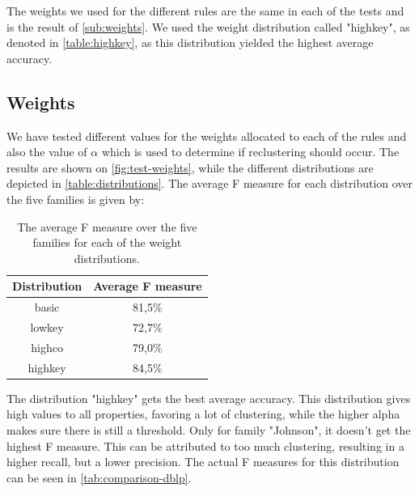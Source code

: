 The weights we used for the different rules are the same in each of the tests and is the result of \autoref{sub:weights}. We used the weight distribution called "highkey", as denoted in \autoref{table:highkey}, as this distribution yielded the highest average accuracy.



\subsection{Weights}
\label{sub:weights}

We have tested different values for the weights allocated to each of the rules and also the value of $\alpha$ which is used to determine if reclustering should occur. The results are shown on \autoref{fig:test-weights}, while the different distributions are depicted in \autoref{table:distributions}. The average F measure for each distribution over the five families is given by:

\begin{table}[ht]
	\center
	\begin{tabular}{|c|c|}
		\hline
		\bfseries{Distribution} & \bfseries{Average F measure} \\
		\hline
		basic & 81,5\% \\
		\hline
		lowkey & 72,7\% \\
		\hline
		highco & 79,0\% \\
		\hline
		highkey & 84,5\% \\
		\hline
	\end{tabular}
	\caption{The average F measure over the five families for each of the weight distributions.}
	\label{tab:avg-f-distr}
\end{table}

The distribution "highkey" gets the best average accuracy. This distribution gives high values to all properties, favoring a lot of clustering, while the higher alpha makes sure there is still a threshold. Only for family "Johnson", it doesn't get the highest F measure. This can be attributed to too much clustering, resulting in a higher recall, but a lower precision. The actual F measures for this distribution can be seen in \autoref{tab:comparison-dblp}.

